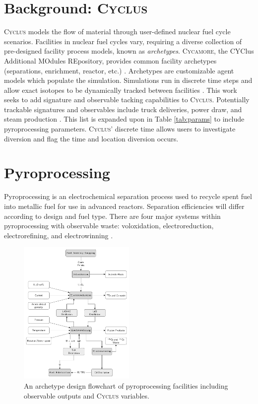 \documentclass{anstrans}
\newcommand{\Cyclus}{\textsc{Cyclus}\xspace}%
\newcommand{\Cycamore}{\textsc{Cycamore}\xspace}%
\begin{document}
\section{Background: \Cyclus}
\Cyclus models the flow of material through user-defined nuclear fuel cycle scenarios. Facilities in nuclear fuel cycles vary, 
requiring a diverse collection of pre-designed facility process models, known as \emph{archetypes}. \Cycamore, the CYClus 
Additional MOdules REpository, provides common facility archetypes (separations, enrichment, reactor, etc.)
\cite{carlsen_cycamore_2014}. Archetypes are customizable agent models which populate the simulation. Simulations run in discrete time steps and allow exact isotopes to be dynamically tracked between facilities \cite{huff_fundamental_2016}. This work seeks to add signature and observable tacking capabilities to \Cyclus. Potentially trackable signatures and observables include truck deliveries, power draw, and steam production  \cite{Hou_2016,Yilmaz_2016}. This list is expanded upon in Table \ref{tab:params} to include pyroprocessing parameters.
\Cyclus' discrete time allows users to investigate diversion and flag the time and location diversion occurs.

\section{Pyroprocessing}
Pyroprocessing is an electrochemical separation process used to recycle spent fuel into metallic fuel for use in advanced reactors.
Separation efficiencies will differ according to design and fuel type. There are four major 
systems within pyroprocessing with observable waste: voloxidation, electroreduction, electrorefining, and electrowinning \cite{Borrelli_2017}.  

\begin{figure}[ht] %
	\centering
	\includegraphics[width=0.5\textwidth]{flowchart}
	\caption{An archetype design flowchart of pyroprocessing facilities including observable outputs and \Cyclus variables.}
	\label{fig:flowchart}
\end{figure}
\end{document}
